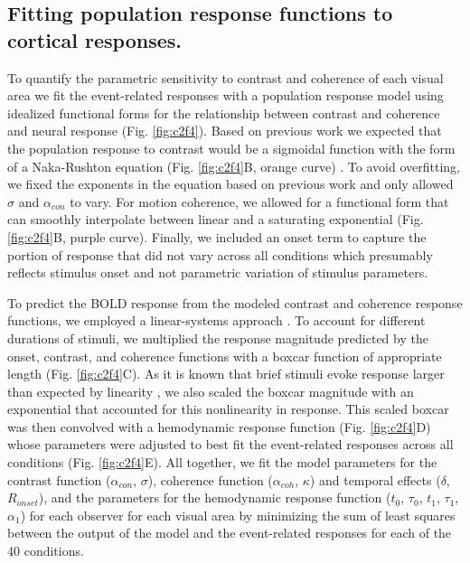 \subsection{Fitting population response functions to cortical responses.}

To quantify the parametric sensitivity to contrast and coherence of each visual area we fit the event-related responses with a population response model using idealized functional forms for the relationship between contrast and coherence and neural response (Fig. \ref{fig:c2f4}). Based on previous work we expected that the population response to contrast would be a sigmoidal function \citep{Albrecht1982-rq,Sclar1990-lk,Boynton1999-jd} with the form of a Naka-Rushton equation (Fig. \ref{fig:c2f4}B, orange curve) \citep{Naka1966-fh}. To avoid overfitting, we fixed the exponents in the equation based on previous work \citep{Boynton1999-jd} and only allowed $\sigma$ and $\alpha_{con}$ to vary. For motion coherence, we allowed for a functional form that can smoothly interpolate between linear \citep{Britten1992-xy,Britten1993-oh,Simoncelli1998-ts,Rees2000-ul} and a saturating exponential (Fig. \ref{fig:c2f4}B, purple curve). Finally, we included an onset term to capture the portion of response that did not vary across all conditions which presumably reflects stimulus onset and not parametric variation of stimulus parameters.

To predict the BOLD response from the modeled contrast and coherence response functions, we employed a linear-systems approach \citep{Heeger2000-pq,Rees2000-ul,Logothetis2001-kk}. To account for different durations of stimuli, we multiplied the response magnitude predicted by the onset, contrast, and coherence functions with a boxcar function of appropriate length (Fig. \ref{fig:c2f4}C). As it is known that brief stimuli evoke response larger than expected by linearity \citep{Boynton1996-ff,Boynton2012-xy}, we also scaled the boxcar magnitude with an exponential that accounted for this nonlinearity in response. This scaled boxcar was then convolved with a hemodynamic response function (Fig. \ref{fig:c2f4}D) whose parameters were adjusted to best fit the event-related responses across all conditions (Fig. \ref{fig:c2f4}E). All together, we fit the model parameters for the contrast function ($\alpha_{con}$, $\sigma$), coherence function ($\alpha_{coh}$, $\kappa$) and temporal effects ($\delta$, $R_{onset}$), and the parameters for the hemodynamic response function ($t_0$, $\tau_0$, $t_1$, $\tau_1$, $\alpha_1$) for each observer for each visual area by minimizing the sum of least squares between the output of the model and the event-related responses for each of the 40 conditions.

